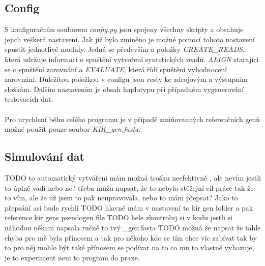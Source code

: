 \documentclass[czech,DP]{thesiskiv}
\numberwithin{equation}{section}
\begin{document}
\subsection{Config}
S konfiguračním souborem \textit{config.py} jsou spojeny všechny skripty a obsahuje jejich veškerá nastavení. Jak již bylo zmíněno je možné pomocí tohoto nastavení spustit jednotlivé moduly. Jedná se především o položky \textit{CREATE\_READS}, která udržuje informaci o spuštění vytvoření syntetických readů. \textit{ALIGN} starající se o spuštění zarovnání a \textit{EVALUATE}, která řídí spuštění vyhodnocení zarovnání. Důležitou položkou v configu jsou cesty ke zdrojovým a výstupním složkám. Dalším nastavením je obsah haplotypu při případném vygenerování testovacích dat.
\\
\\
Pro urychlení běhu celého programu je v případě zmiňovanných referenčních genů možné použít pouze soubor \textit{KIR\_gen.fasta}.

\subsection{Simulování dat}
TODO to automatický vytváření mám možná trošku neefektivně , ale nevím jestli to úplně vadí nebo ne? 
třeba můžu napsat, že to nebylo stěžejní cíl práce tak že to vím, ale že už jsem to pak neupravovala, nebo to mám přepsat? Jako to přepsání asi bude rychlí
TODO hlavně mám v nastavení to kir gen folder a pak reference kir gens pseudogen file
TODO hele zkontroluj si v kodu jestli si náhodou někam napsala ručně to tvý \_gen.fasta
TODO možná že napsat že tahle chyba pro mě byla přínosem a tak pro někoho kdo se tím chce víc zabívat tak by to pro něj mohlo být také přínosem se podívat na to co mu to vlastně vyhazuje, je to experiment neni to program do praxe.
\end{document}
